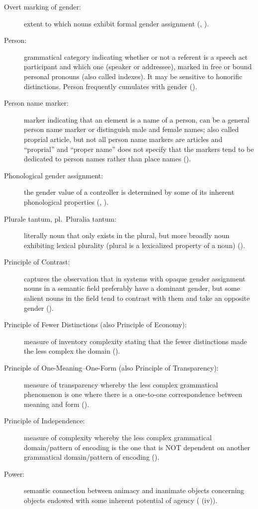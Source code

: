 \documentclass[output=collectionpaper]{langsci/langscibook}
\begin{document}
{\begin{description}
\item  [Overt marking of gender:] extent to which nouns exhibit formal gender assignment (, ).
\item  [Person:] grammatical category indicating whether or not a referent is a speech act participant and which one (speaker or addressee), marked in free or bound personal pronouns (also called indexes). It may be sensitive to honorific distinctions. Person frequently cumulates with gender ().
\item  [Person name marker:] marker indicating that an element is a name of a person, can be a general person name marker or distinguish male and female names; also called proprial article, but not all person name markers are articles and “proprial” and “proper name” does not specify that the markers tend to be dedicated to person names rather than place names ().
\item  [Phonological gender assignment:] the gender value of a controller is determined by some of its inherent phonological properties (, ).
\item  [Plurale tantum, {\normalfont pl.}\ Pluralia tantum:] literally noun that only exists in the plural, but more broadly noun exhibiting lexical plurality (plural is a lexicalized property of a noun) ().
\item  [Principle of Contrast:] captures the observation that in systems with opaque gender assignment nouns in a semantic field preferably have a dominant gender, but some salient nouns in the field tend to contrast with them and take an opposite gender ().
\item  [Principle of Fewer Distinctions (also Principle of Economy):] measure of inventory complexity stating that the fewer distinctions made the less complex the domain ().
\item  [Principle of One-Meaning–One-Form (also Principle of Transparency):] measure of transparency whereby the less complex grammatical phenomenon is one where there is a one-to-one correspondence between meaning and form ().
\item  [Principle of Independence:] measure of complexity whereby the less complex grammatical domain/pattern of encoding is the one that is NOT dependent on another grammatical domain/pattern of encoding ().
\item  [Power:] semantic connection between animacy and inanimate objects concerning objects endowed with some inherent potential of agency ( (iv)).

\end{description}}
\end{document}
